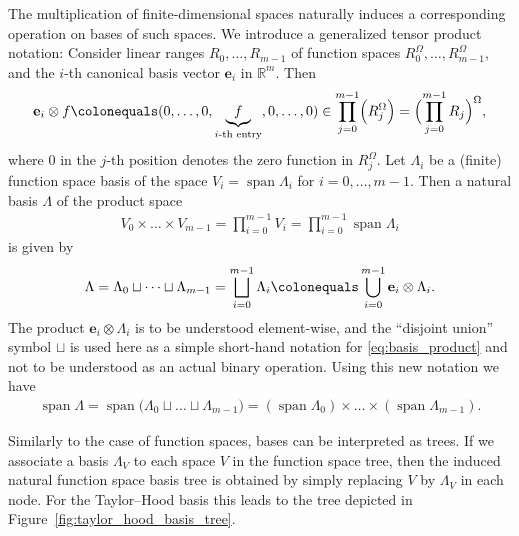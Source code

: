 \documentclass[a4paper,10pt,headings=normal,bibliography=totoc]{scrartcl}
\newcommand{\R}{\mathbb{R}}
\begin{document}
The multiplication of finite-dimensional spaces naturally induces a corresponding operation on bases
of such spaces.  We introduce a generalized tensor product notation:
Consider linear ranges $R_0,\dots,R_{m-1}$ of function spaces $R_0^\Omega,\dots,R_{m-1}^\Omega$,
and the $i$-th canonical basis vector $\mathbf{e}_i$ in $\R^m$.
Then
\begin{align*}
  \mathbf{e}_i \otimes f
  \colonequals (0,\dots,0,\underbrace{f}_{\text{$i$-th entry}},0,\dots,0)
  \in \prod_{j=0}^{m-1} \Bigl(R_j^\Omega\Bigr) = \Bigl(\prod_{j=0}^{m-1} R_j\Bigr)^\Omega,
\end{align*}
where $0$ in the $j$-th position denotes the zero function in $R_j^\Omega$.
Let $\Lambda_i$ be a (finite) function space basis of the space $V_i = \operatorname{span} \Lambda_i$
for $i=0,\dots,m-1$. Then a natural basis $\Lambda$ of the product space
\begin{align*}
  V_0 \times \dots \times V_{m-1}
  = \prod_{i=0}^{m-1} V_i
  = \prod_{i=0}^{m-1} \operatorname{span}\Lambda_i
\end{align*}
is given by
\begin{align}
  \label{eq:basis_product}
  \Lambda =
    \Lambda_0 \sqcup \dots \sqcup \Lambda_{m-1}
    = \bigsqcup_{i=0}^{m-1} \Lambda_i
    \colonequals \bigcup_{i=0}^{m-1} \mathbf{e}_i \otimes \Lambda_i.
\end{align}
The product $\mathbf{e}_i \otimes \Lambda_i$ is to be understood element-wise,
and the ``disjoint union'' symbol $\sqcup$ is used here
as a simple short-hand notation for \eqref{eq:basis_product}
and not to be understood as an actual binary operation.
Using this new notation we have
\begin{align*}
  \operatorname{span} \Lambda
    = \operatorname{span} \bigl( \Lambda_0 \sqcup \dots \sqcup \Lambda_{m-1} \bigr)
    = (\operatorname{span} \Lambda_0) \times \dots \times (\operatorname{span} \Lambda_{m-1}).
\end{align*}

Similarly to the case of function spaces, bases can be interpreted as trees.
If we associate a basis $\Lambda_V$ to each space $V$ in the function space tree,
then the induced natural function space basis tree is obtained by simply replacing
$V$ by $\Lambda_V$ in each node. For the Taylor--Hood basis this leads to the
tree depicted in Figure~\ref{fig:taylor_hood_basis_tree}.
\end{document}
